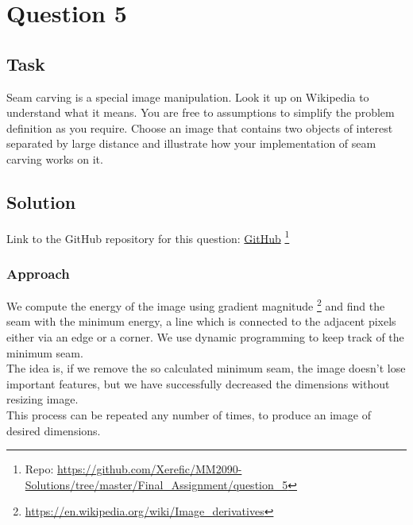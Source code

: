 \section{Question 5}

\subsection{Task}
Seam carving is a special image manipulation. Look it up on Wikipedia to understand what it means. You are free to assumptions to simplify the problem definition as you require. Choose an image that contains two objects of interest separated by large distance and illustrate how your implementation of seam carving works on it.


\subsection{Solution}

Link to the GitHub repository for this question: \href{https://github.com/Xerefic/MM2090-Solutions/tree/master/Final_Assignment/question_5}{GitHub} \footnote{Repo: \url{https://github.com/Xerefic/MM2090-Solutions/tree/master/Final_Assignment/question_5}}

\subsubsection{Approach}
We compute the energy of the image using gradient magnitude \footnote{\url{https://en.wikipedia.org/wiki/Image_derivatives}} and find the seam with the minimum energy, a line which is connected to the adjacent pixels either via an edge or a corner. We use dynamic programming to keep track of the minimum seam. \\
The idea is, if we remove the so calculated minimum seam, the image doesn’t lose important features, but we have successfully decreased the dimensions without resizing image.\\
This process can be repeated any number of times, to produce an image of desired dimensions.

